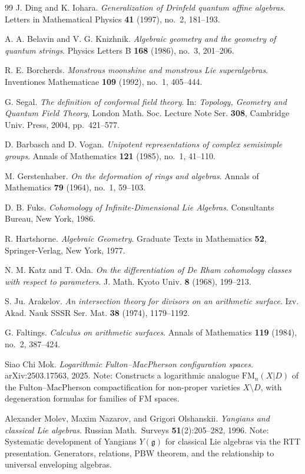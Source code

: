 \begin{thebibliography}{99}
J. Ding and K. Iohara.
\textit{Generalization of Drinfeld quantum affine algebras}.
Letters in Mathematical Physics \textbf{41} (1997), no.~2, 181--193.

A. A. Belavin and V. G. Knizhnik.
\textit{Algebraic geometry and the geometry of quantum strings}.
Physics Letters B \textbf{168} (1986), no.~3, 201--206.

R. E. Borcherds.
\textit{Monstrous moonshine and monstrous Lie superalgebras}.
Inventiones Mathematicae \textbf{109} (1992), no.~1, 405--444.

G. Segal.
\textit{The definition of conformal field theory}.
In: \textit{Topology, Geometry and Quantum Field Theory}, London Math. Soc. Lecture Note Ser. \textbf{308}, Cambridge Univ. Press, 2004, pp.~421--577.

D. Barbasch and D. Vogan.
\textit{Unipotent representations of complex semisimple groups}.
Annals of Mathematics \textbf{121} (1985), no.~1, 41--110.

M. Gerstenhaber.
\textit{On the deformation of rings and algebras}.
Annals of Mathematics \textbf{79} (1964), no.~1, 59--103.

D. B. Fuks.
\textit{Cohomology of Infinite-Dimensional Lie Algebras}.
Consultants Bureau, New York, 1986.

R. Hartshorne.
\textit{Algebraic Geometry}.
Graduate Texts in Mathematics \textbf{52}, Springer-Verlag, New York, 1977.

N. M. Katz and T. Oda.
\textit{On the differentiation of De Rham cohomology classes with respect to parameters}.
J. Math. Kyoto Univ. \textbf{8} (1968), 199--213.

S. Ju. Arakelov.
\textit{An intersection theory for divisors on an arithmetic surface}.
Izv. Akad. Nauk SSSR Ser. Mat. \textbf{38} (1974), 1179--1192.

G. Faltings.
\textit{Calculus on arithmetic surfaces}.
Annals of Mathematics \textbf{119} (1984), no.~2, 387--424.


Siao Chi Mok.
\textit{Logarithmic Fulton--MacPherson configuration spaces}.
arXiv:2503.17563, 2025.
Note: Constructs a logarithmic analogue $\mathrm{FM}_n(X|D)$ of the
Fulton--MacPherson compactification for non-proper varieties $X \setminus D$,
with degeneration formulas for families of FM spaces.

Alexander Molev, Maxim Nazarov, and Grigori Olshanskii.
\textit{Yangians and classical Lie algebras}.
Russian Math.\ Surveys \textbf{51}(2):205--282, 1996.
Note: Systematic development of Yangians $Y(\mathfrak{g})$ for classical
Lie algebras via the RTT presentation.  Generators, relations, PBW theorem,
and the relationship to universal enveloping algebras.


\end{thebibliography}
